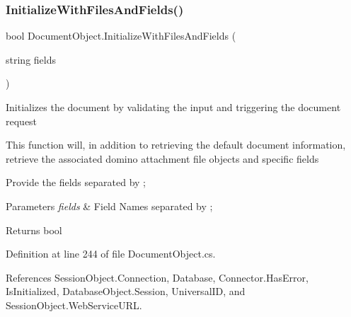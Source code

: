 \subsubsection{\texorpdfstring{Initialize\+With\+Files\+And\+Fields()}{InitializeWithFilesAndFields()}\hspace{0.1cm}{\footnotesize\ttfamily [2/2]}}
{\footnotesize\ttfamily bool Document\+Object.\+Initialize\+With\+Files\+And\+Fields (\begin{DoxyParamCaption}\item[{string}]{fields }\end{DoxyParamCaption})}



Initializes the document by validating the input and triggering the document request 

This function will, in addition to retrieving the default document information, retrieve the associated domino attachment file objects and specific fields

Provide the fields separated by ;


\begin{DoxyParams}{Parameters}
{\em fields} & Field Names separated by ; \\
\hline
\end{DoxyParams}
\begin{DoxyReturn}{Returns}
bool
\end{DoxyReturn}


Definition at line 244 of file Document\+Object.\+cs.



References Session\+Object.\+Connection, Database, Connector.\+Has\+Error, Is\+Initialized, Database\+Object.\+Session, Universal\+ID, and Session\+Object.\+Web\+Service\+U\+RL.


